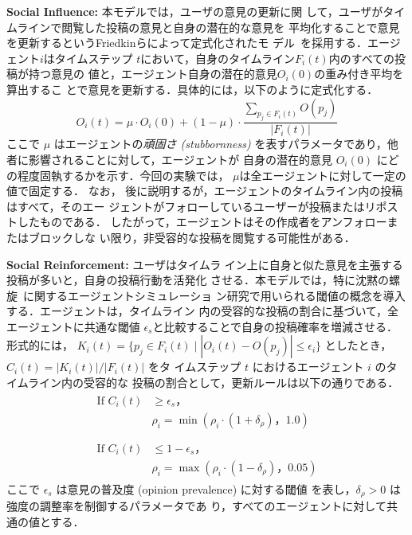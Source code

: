 \documentclass[a4j]{ujarticle}
\def\post{\rho} %
\def\BoundedConfidence{\epsilon}
\def\stubbornness{\mu}
\begin{document}
\begin{description}
\item \textbf{Social Influence:} 本モデルでは，ユーザの意見の更新に関
  して，ユーザがタイムラインで閲覧した投稿の意見と自身の潜在的な意見を
  平均化することで意見を更新するというFriedkinらによって定式化されたモ
  デル~\cite{Friedkin1990}を採用する．エージェント$i$はタイムステップ
  $t$において，自身のタイムライン$F_i(t)$内のすべての投稿が持つ意見の
  値と，エージェント自身の潜在的意見$O_i(0)$の重み付き平均を算出するこ
  とで意見を更新する．具体的には，以下のように定式化する．
  \begin{equation}\label{FJmodel}
   O_i(t) = \stubbornness \cdot O_i(0) + (1 - \stubbornness) \cdot \frac{\sum_{p_j \in F_i(t)} O(p_j)}{|F_i(t)|}
  \end{equation}
  ここで $\stubbornness$ はエージェントの\emph{頑固さ (stubbornness)}
  を表すパラメータであり，他者に影響されることに対して，エージェントが
  自身の潜在的意見 $O_i(0)$ にどの程度固執するかを示す．今回の実験では，
  $\stubbornness$は全エージェントに対して一定の値で固定する．  なお，
  後に説明するが，エージェントのタイムライン内の投稿はすべて，そのエー
  ジェントがフォローしているユーザーが投稿またはリポストしたものである．
  したがって，エージェントはその作成者をアンフォローまたはブロックしな
  い限り，非受容的な投稿を閲覧する可能性がある．

\item \textbf{Social Reinforcement:}\label{SocReinfo} ユーザはタイムラ
  イン上に自身と似た意見を主張する投稿が多いと，自身の投稿行動を活発化
  させる．本モデルでは，特に沈黙の螺
  旋~\cite{NoelleNeumann1974,Sohn2015}に関するエージェントシミュレーショ
  ン研究で用いられる閾値の概念を導入する．エージェントは，タイムライン
  内の受容的な投稿の割合に基づいて，全エージェントに共通な閾値
  $\epsilon_s$と比較することで自身の投稿確率を増減させる．形式的には，
  $K_i(t)=\{p_j \in F_i(t) \mid |O_i(t) - O(p_j)| \leq
  \BoundedConfidence_i\}$ としたとき，$C_i(t)= |K_i(t)|/|F_i(t)|$ をタ
  イムステップ $t$ におけるエージェント $i$ のタイムライン内の受容的な
  投稿の割合として，更新ルールは以下の通りである．
  \begin{align}
    \begin{aligned}
      \text{If } C_i(t) & \geq \epsilon_s，\\[-2pt]
      & \post_i = \min(\post_i \cdot (1 + \delta_{\post})，1.0)\\
    \end{aligned}\\
    \begin{aligned}
      \text{If } C_i(t) & \leq 1-\epsilon_s，\\[-2pt]
      & \post_i = \max(\post_i \cdot (1 - \delta_{\post})，0.05)
    \end{aligned}
\end{align}
  ここで $\epsilon_s$ は意見の普及度 (opinion prevalence) に対する閾値
  を表し，$\delta_{\post} > 0$ は強度の調整率を制御するパラメータであ
  り，すべてのエージェントに対して共通の値とする．


\end{description}
\end{document}
